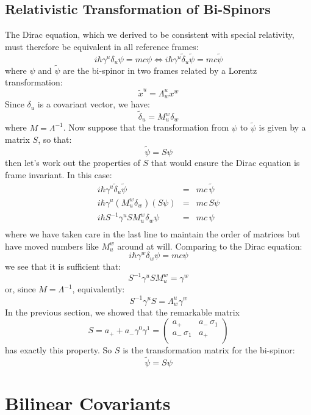 \documentclass[12pt]{book}
\begin{document}
\subsection{Relativistic Transformation of Bi-Spinors}
The Dirac equation, which we derived to be consistent with special relativity, must therefore be equivalent in all reference frames:
$$i\hbar \gamma^u \delta_u \psi = mc \psi \Leftrightarrow 
i\hbar \gamma^u \widetilde{\delta}_u \widetilde{\psi} = mc \widetilde{\psi}$$
where $\psi$ and $\widetilde{\psi}$ are the bi-spinor in two frames related by a Lorentz transformation:
$$\widetilde{x}^u = \Lambda^u_w x^w$$
Since $\delta_u$ is a covariant vector, we have:
$$\widetilde{\delta}_u = M^w_u \delta_w$$
where $M = \Lambda^{-1}$.  Now suppose that the transformation from $\psi$ to $\widetilde{\psi}$ is given by a matrix $S$, so that:
$$\widetilde{\psi} = S \psi$$
then let's work out the properties of $S$ that would ensure the Dirac equation is frame invariant.  In this case:
\begin{eqnarray*}
i\hbar \gamma^u \widetilde{\delta}_u \widetilde{\psi} &=& mc \, \widetilde{\psi} \\[3pt]
i\hbar \gamma^u (M^w_u \delta_w) (S \psi) &=& mc \, S \psi \\[3pt]
i\hbar S^{-1} \gamma^u S M^w_u \delta_w \psi &=& mc \, \psi \\
\end{eqnarray*}
where we have taken care in the last line to maintain the order of matrices but have moved numbers like $M^w_u$ around at will.  Comparing to the Dirac equation:
$$i\hbar \gamma^w \delta_w \psi = mc \psi$$
we see that it is sufficient that:
$$S^{-1} \gamma^u S M^w_u = \gamma^w$$
or, since $M = \Lambda^{-1}$, equivalently:
$$S^{-1} \gamma^u S = \Lambda_w^u \gamma^w$$
In the previous section, we showed that the remarkable matrix 
$$S = a_+ + a_- \gamma^0 \gamma^1 = \begin{pmatrix} 
a_+ & a_- \, \sigma_1 \\ 
a_- \, \sigma_1 & a_+ \\
\end{pmatrix}
$$
has exactly this property.  So $S$ is the transformation matrix for the bi-spinor:
$$\widetilde{\psi} = S \psi$$

\section{Bilinear Covariants}
\end{document}
